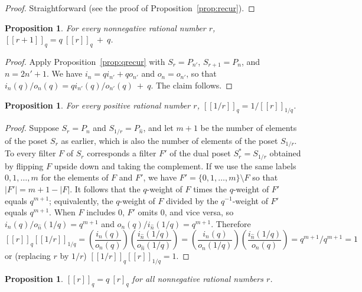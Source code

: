 \documentclass[12pt]{article}
\theoremstyle{plain}
\newtheorem{proposition}[theorem]{Proposition}
\theoremstyle{definition}
\theoremstyle{remark}
\newcommand{\llb}{[\![}
\newcommand{\rrb}{]\!]}
\begin{document}
\begin{proof}
Straightforward (see the proof of Proposition~\ref{prop:recur}).
\end{proof}

\begin{proposition}
For every nonnegative rational number $r$,
$\llb r+1 \rrb_q = q \: \llb r \rrb_q \: + \: q$.
\label{prop:add}
\end{proposition}

\begin{proof}
Apply Proposition~\ref{prop:qrecur}
with $S_r = P_{n'}$, $S_{r+1} = P_{n}$, and $n=2n'+1$.
We have $i_{n} = q i_{n'} + q o_{n'}$ and $o_{n} = o_{n'}$,
so that $i_n(q)/o_n(q) = q i_{n'}(q)/o_{n'}(q) \: + \: q$.
The claim follows.
\end{proof}

\begin{proposition}
For every positive rational number $r$,
$\llb 1/r \rrb_q = 1 / \llb r \rrb_{1/q}$.
\label{prop:flip}
\end{proposition}

\begin{proof}
Suppose $S_r = P_n$ and $S_{1/r} = P_{\hat{n}}$,
and let $m+1$ be the number of elements of the poset $S_r$ as earlier,
which is also the number of elements of the poset $S_{1/r}$.
To every filter $F$ of $S_r$ corresponds a filter $F'$ 
of the dual poset $S_r^* = S_{1/r}$
obtained by flipping $F$ upside down and taking the complement.
If we use the same labels $0,1,\dots,m$ for
the elements of $F$ and $F'$, we have $F' = \{0,1,\dots,m\} \setminus F$
so that $|F'| = m+1 - |F|$. It follows that 
the $q$-weight of $F$ times the $q$-weight of $F'$ equals $q^{m+1}$;
equivalently, the $q$-weight of $F$ divided by the $q^{-1}$-weight of $F'$
equals $q^{m+1}$.
When $F$ includes 0, $F'$ omits 0, and vice versa,
so $i_n(q) / o_{\hat{n}}(1/q) = q^{m+1}$ and $o_n(q) / i_{\hat{n}}(1/q) = q^{m+1}$.
Therefore
$$\llb r \rrb_q \llb 1/r \rrb_{1/q} =
  \left( \frac{i_n(q)}{o_n(q)} \right) 
  \left( \frac{i_{\hat{n}}(1/q)}{o_{\hat{n}}(1/q)} \right) =
  \left( \frac{i_n(q)}{o_{\hat{n}}(1/q)} \right) 
  \left( \frac{i_{\hat{n}}(1/q)}{o_n(q)} \right) = q^{m+1}/q^{m+1} = 1$$
or (replacing $r$ by $1/r$) $\llb 1/r \rrb_q \llb r \rrb_{1/q} = 1$.
\end{proof}

\begin{proposition}
$\llb r \rrb_q = q \: [r]_q$ for all nonnegative rational numbers $r$.
\label{prop:q}
\end{proposition}
\end{document}

